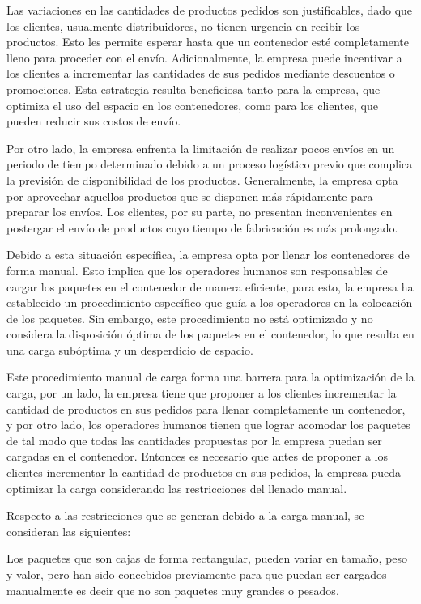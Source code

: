 Las variaciones en las cantidades de productos pedidos son justificables, dado que los clientes, usualmente distribuidores, no tienen urgencia en recibir los productos. Esto les permite esperar hasta que un contenedor esté completamente lleno para proceder con el envío. Adicionalmente, la empresa puede incentivar a los clientes a incrementar las cantidades de sus pedidos mediante descuentos o promociones. Esta estrategia resulta beneficiosa tanto para la empresa, que optimiza el uso del espacio en los contenedores, como para los clientes, que pueden reducir sus costos de envío.

Por otro lado, la empresa enfrenta la limitación de realizar pocos envíos en un periodo de tiempo determinado debido a un proceso logístico previo que complica la previsión de disponibilidad de los productos. Generalmente, la empresa opta por aprovechar aquellos productos que se disponen más rápidamente para preparar los envíos. Los clientes, por su parte, no presentan inconvenientes en postergar el envío de productos cuyo tiempo de fabricación es más prolongado.

Debido a esta situación específica, la empresa opta por llenar los contenedores de forma manual. Esto implica que los operadores humanos son responsables de cargar los paquetes en el contenedor de manera eficiente, para esto, la empresa ha establecido un procedimiento específico que guía a los operadores en la colocación de los paquetes. Sin embargo, este procedimiento no está optimizado y no considera la disposición óptima de los paquetes en el contenedor, lo que resulta en una carga subóptima y un desperdicio de espacio.

Este procedimiento manual de carga forma una barrera para la optimización de la carga, por un lado, la empresa tiene que proponer a los clientes incrementar la cantidad de productos en sus pedidos para llenar completamente un contenedor, y por otro lado, los operadores humanos tienen que lograr acomodar los paquetes de tal modo que todas las cantidades propuestas por la empresa puedan ser cargadas en el contenedor. Entonces es necesario que antes de proponer a los clientes incrementar la cantidad de productos en sus pedidos, la empresa pueda optimizar la carga considerando las restricciones del llenado manual.

Respecto a las restricciones que se generan debido a la carga manual, se consideran las siguientes:

Los paquetes que son cajas de forma rectangular, pueden variar en tamaño, peso y valor, pero han sido concebidos previamente para que puedan ser cargados manualmente es decir que no son paquetes muy grandes o pesados.

